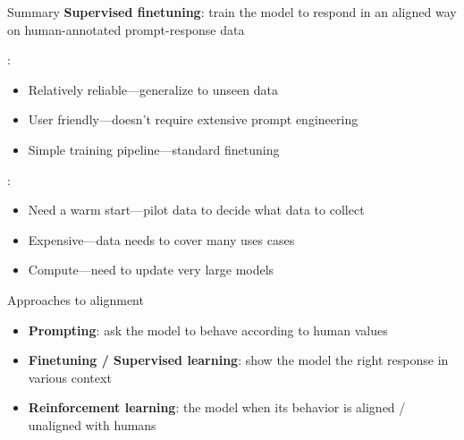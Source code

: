 \documentclass[usenames,dvipsnames,notes,11pt,aspectratio=169,hyperref={colorlinks=true, linkcolor=blue}]{beamer}
\begin{document}
\begin{frame}
    {Summary}
    \textbf{Supervised finetuning}: train the model to respond in an aligned way on human-annotated prompt-response data 

    :\\
    \begin{itemize}
        \item Relatively reliable---generalize to unseen data
        \item User friendly---doesn't require extensive prompt engineering
        \item Simple training pipeline---standard finetuning
    \end{itemize}

    \pause
    :\\
    \begin{itemize}
        \item Need a warm start---pilot data to decide what data to collect
        \item Expensive---data needs to cover many uses cases 
        \item Compute---need to update very large models 
    \end{itemize}
\end{frame}

\begin{frame}
    {Approaches to alignment}
    \begin{itemize}
        \itemsep1em
            
        \item \textcolor<1->{fg!20}{\textbf{Prompting}: {ask} the model to behave according to human values}
        \item \textcolor<1->{fg!20}{\textbf{Finetuning / Supervised learning}: {show} the model the right response in various context
        }
        \item \textbf{Reinforcement learning}:  the model when its behavior is aligned / unaligned with humans 
    \end{itemize}
\end{frame}
\end{document}
